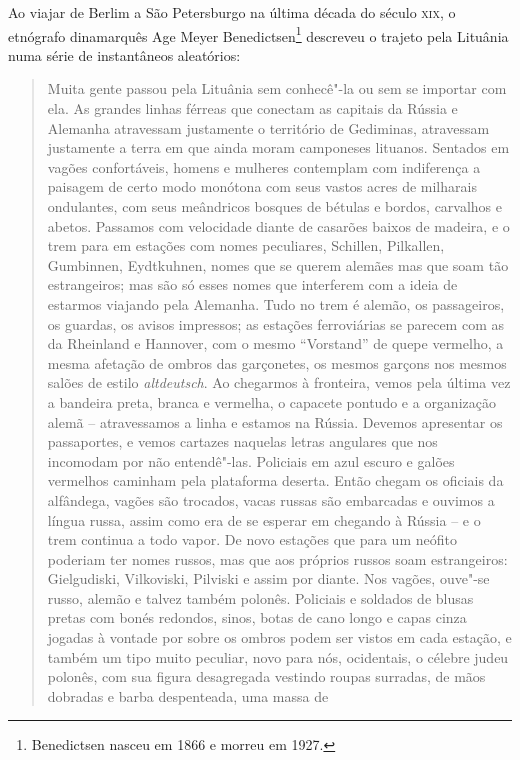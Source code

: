 \asterisc

Ao viajar de Berlim a São Petersburgo na última década do século \textsc{xix}, o
etnógrafo dinamarquês Age Meyer Benedictsen\footnote{Benedictsen nasceu em 1866 e morreu em 1927.} descreveu o
trajeto pela Lituânia numa série de instantâneos aleatórios:

\begin{quote}
Muita gente passou pela Lituânia sem conhecê"-la ou sem se importar com
ela. As grandes linhas férreas que conectam as capitais da Rússia e
Alemanha atravessam justamente o território de Gediminas, atravessam
justamente a terra em que ainda moram camponeses lituanos. Sentados em
vagões confortáveis, homens e mulheres contemplam com indiferença a
paisagem de certo modo monótona com seus vastos acres de milharais
ondulantes, com seus meândricos bosques de bétulas e bordos, carvalhos e
abetos. Passamos com velocidade diante de casarões baixos de madeira, e
o trem para em estações com nomes peculiares, Schillen, Pilkallen,
Gumbinnen, Eydtkuhnen, nomes que se querem alemães mas que soam tão
estrangeiros; mas são só esses nomes que interferem com a ideia de
estarmos viajando pela Alemanha. Tudo no trem é alemão, os passageiros,
os guardas, os avisos impressos; as estações ferroviárias se parecem com
as da Rheinland e Hannover, com o mesmo ``Vorstand'' de quepe vermelho,
a mesma afetação de ombros das garçonetes, os mesmos garçons nos mesmos
salões de estilo \textit{altdeutsch}. Ao chegarmos à fronteira, vemos pela
última vez a bandeira preta, branca e vermelha, o capacete pontudo e a
organização alemã -- atravessamos a linha e estamos na Rússia. Devemos
apresentar os passaportes, e vemos cartazes naquelas letras angulares
que nos incomodam por não entendê"-las. Policiais em azul escuro e galões
vermelhos caminham pela plataforma deserta. Então chegam os oficiais da
alfândega, vagões são trocados, vacas russas são embarcadas e ouvimos a
língua russa, assim como era de se esperar em chegando à Rússia -- e o
trem continua a todo vapor. De novo estações que para um neófito
poderiam ter nomes russos, mas que aos próprios russos soam
estrangeiros: Gielgudiski, Vilkoviski, Pilviski e assim por diante. Nos
vagões, ouve"-se russo, alemão e talvez também polonês. Policiais e
soldados de blusas pretas com bonés redondos, sinos, botas de cano longo
e capas cinza jogadas à vontade por sobre os ombros podem ser vistos em
cada estação, e também um tipo muito peculiar, novo para nós,
ocidentais, o célebre judeu polonês, com sua figura desagregada vestindo
roupas surradas, de mãos dobradas e barba despenteada, uma massa de

\end{quote}
